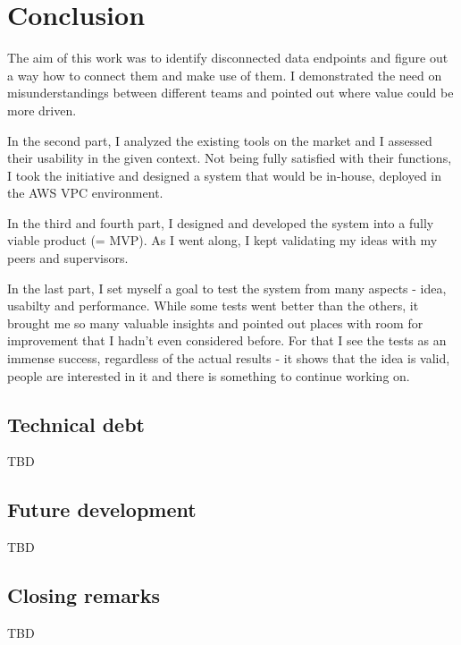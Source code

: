 \chapter{Conclusion}

The aim of this work was to identify disconnected data endpoints and figure out a way how to connect them and make use of them. I demonstrated the need on misunderstandings between different teams and pointed out where value could be more driven.

In the second part, I analyzed the existing tools on the market and I assessed their usability in the given context. Not being fully satisfied with their functions, I took the initiative and designed a system that would be in-house, deployed in the AWS VPC environment. 

In the third and fourth part, I designed and developed the system into a fully viable product (= MVP). As I went along, I kept validating my ideas with my peers and supervisors.

In the last part, I set myself a goal to test the system from many aspects - idea, usabilty and performance. While some tests went better than the others, it brought me so many valuable insights and pointed out places with room for improvement that I hadn't even considered before. For that I see the tests as an immense success, regardless of the actual results - it shows that the idea is valid, people are interested in it and there is something to continue working on.

\section{Technical debt}
TBD

\section{Future development}
TBD

\section{Closing remarks}
TBD